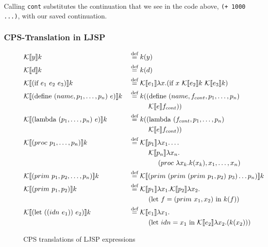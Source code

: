 \documentclass[11pt]{report}
\newcommand{\eqdef}{\stackrel{\text{def}}{=}}%
\newcommand{\cpstrans}[1]{\ensuremath{\mathcal{K}\llbracket #1 \rrbracket}}
\begin{document}
Calling \texttt{cont} substitutes the continuation that we see in the code above, \texttt{(+ 1000 ...)}, with our saved continuation.

\subsubsection{CPS-Translation in LJSP}
\begin{figure}[ht]
\begin{alignat*}{2}
&\cpstrans{y} k &&\eqdef k(y) \\
%
&\cpstrans{d} k &&\eqdef k(d) \\
%
&\cpstrans{(\text{if}\ e_1\ e_2\ e_3)} k &&\eqdef \cpstrans{e_1} \lambda x.(\text{if}\ x\ \cpstrans{e_2}k\ \cpstrans{e_3}k) \\
%
&\cpstrans{(\text{define}\ (name, p_1, \dots, p_n)\ e)} k &&\eqdef k((\text{define}\ (name, f_{cont}, p_1, \dots, p_n)\ \\
&&&\hspace{1cm}\cpstrans{e}f_{cont})) \\
%
&\cpstrans{(\text{lambda}\ (p_1, \dots, p_n)\ e)} k &&\eqdef k((\text{lambda}\ (f_{cont}, p_1, \dots, p_n)\ \\
&&&\hspace{1cm}\cpstrans{e}f_{cont})) \\
%
&\cpstrans{(proc\ p_1, \dots, p_n)} k &&\eqdef \cpstrans{p_1} \lambda x_1. \dots  \\
&&&\hspace{1 cm}\cpstrans{p_n} \lambda x_n.\\
&&&\hspace{1.5 cm}(proc\ \lambda x_k.k(x_k), x_1, \dots, x_n) \\
%
&\cpstrans{(prim\ p_1, p_2, \dots, p_n)} k &&\eqdef \cpstrans{(prim\ (prim\ (prim\ p_1, p_2)\ p_3) \dots p_n)} k\\
%
&\cpstrans{(prim\ p_1, p_2)} k &&\eqdef \cpstrans{p_1}\lambda x_1. \cpstrans{p_2}\lambda x_2.\\
&&&\hspace{1cm}(\text{let}\ f=(prim\ x_1, x_2)\ \text{in}\ k(f))\\
%
&\cpstrans{(\text{let}\ ((idn\ e_1))\ e_2)} k &&\eqdef \cpstrans{e_1} \lambda x_1. \\
&&&\hspace{1 cm}(\text{let}\ idn = x_1\ \text{in}\ \cpstrans{e_2} \lambda x_2.(k(x_2)))\\
\end{alignat*}
\caption{CPS translations of LJSP expressions}
\label{cpstrans}
\end{figure}
\end{document}
